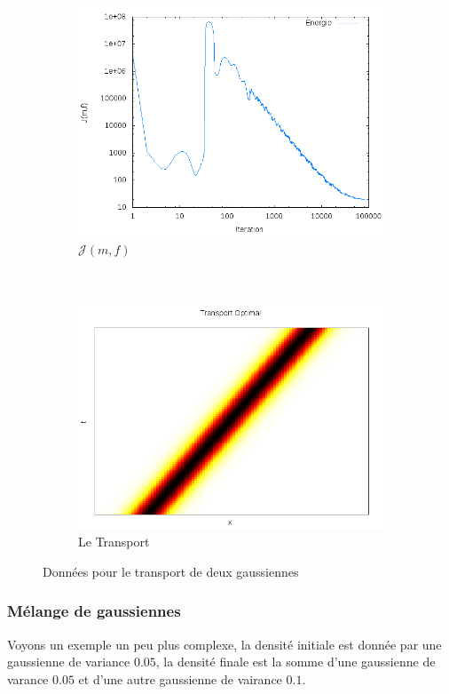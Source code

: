 \documentclass[a4paper,12pt]{article}
\begin{document}
\begin{figure}[!h]
	\begin{subfigure}[b]{0.48\linewidth}
	\includegraphics[width=\textwidth]{img/1DGaussian100x100/energie.png}
	\caption{$\mathcal{J}(m,f)$}
	\end{subfigure}
	~
	\begin{subfigure}[b]{0.48\linewidth}
	\includegraphics[width=\textwidth]{img/1DGaussian100x100/transport.png}
	\caption{Le Transport}
	\end{subfigure}	
	\caption{Données pour le transport de deux gaussiennes}
\end{figure}

\newpage
\subsubsection{Mélange de gaussiennes}
Voyons un exemple un peu plus complexe, la densité initiale est donnée par une gaussienne de variance $0.05$, la densité finale est la somme d'une gaussienne de varance $0.05$ et d'une autre gaussienne de vairance $0.1$. 
\end{document}
